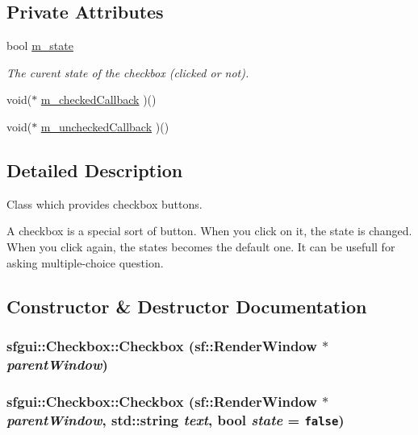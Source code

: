 \subsection*{Private Attributes}
\begin{CompactItemize}
\item 
bool \hyperlink{classsfgui_1_1Checkbox_ce642ae51c0d2aee08ba05be73c5bf06}{m\_\-state}
\begin{CompactList}\small\item\em The curent state of the checkbox (clicked or not). \item\end{CompactList}\item 
void($\ast$ \hyperlink{classsfgui_1_1Checkbox_a597f2897aa340d538d399d0bdcaf26c}{m\_\-checkedCallback} )()
\item 
void($\ast$ \hyperlink{classsfgui_1_1Checkbox_c2420a43e7e62ae3cb0023e8392d3cfd}{m\_\-uncheckedCallback} )()
\end{CompactItemize}


\subsection{Detailed Description}
Class which provides checkbox buttons. 

A checkbox is a special sort of button. When you click on it, the state is changed. When you click again, the states becomes the default one. It can be usefull for asking multiple-choice question. 

\subsection{Constructor \& Destructor Documentation}
\hypertarget{classsfgui_1_1Checkbox_72e99b59f2cd8182a205f4040bedc5c7}{
\subsubsection[Checkbox]{\setlength{\rightskip}{0pt plus 5cm}sfgui::Checkbox::Checkbox (sf::RenderWindow $\ast$ {\em parentWindow})}}
\label{classsfgui_1_1Checkbox_72e99b59f2cd8182a205f4040bedc5c7}


\hypertarget{classsfgui_1_1Checkbox_61f0b87c25055871c7900bf711a1adff}{
\subsubsection[Checkbox]{\setlength{\rightskip}{0pt plus 5cm}sfgui::Checkbox::Checkbox (sf::RenderWindow $\ast$ {\em parentWindow}, \/  std::string {\em text}, \/  bool {\em state} = {\tt false})}}
\label{classsfgui_1_1Checkbox_61f0b87c25055871c7900bf711a1adff}




